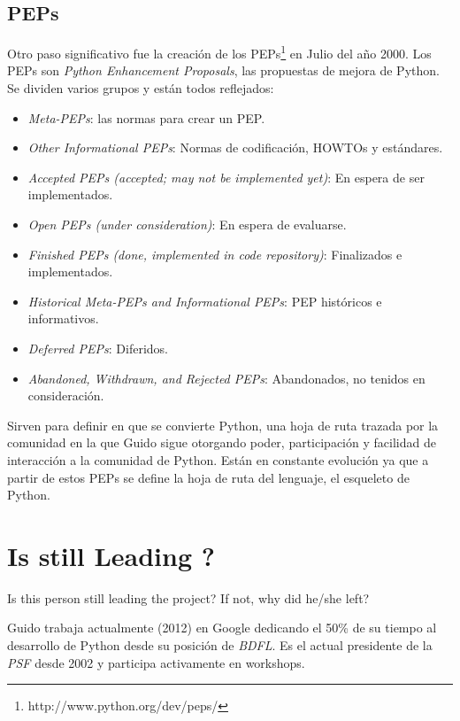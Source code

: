 \documentclass[11pt]{scrartcl}
\begin{document}
\subsection{PEPs}

Otro paso significativo fue la creación de los PEPs\footnote{http://www.python.org/dev/peps/} en Julio del año 2000. Los PEPs son \emph{Python Enhancement Proposals}, las propuestas de mejora de Python. Se dividen varios grupos y están todos reflejados:

\begin{itemize}
    \item \emph{Meta-PEPs}: las normas para crear un PEP.
    \item \emph{Other Informational PEPs}: Normas de codificación, HOWTOs y estándares.
    \item \emph{Accepted PEPs (accepted; may not be implemented yet)}: En espera de ser implementados.
    \item \emph{Open PEPs (under consideration)}: En espera de evaluarse.
    \item \emph{Finished PEPs (done, implemented in code repository)}: Finalizados e implementados.
    \item \emph{Historical Meta-PEPs and Informational PEPs}: PEP históricos e informativos.
    \item \emph{Deferred PEPs}: Diferidos.
    \item \emph{Abandoned, Withdrawn, and Rejected PEPs}: Abandonados, no tenidos en consideración.
\end{itemize}

Sirven para definir en que se convierte Python, una hoja de ruta trazada por la comunidad en la que Guido sigue otorgando poder, participación y facilidad de interacción a la comunidad de Python. Están en constante evolución ya que a partir de estos PEPs se define la hoja de ruta del lenguaje, el esqueleto de Python.

\section{Is still Leading ?}

Is this person still leading the project? If not, why did he/she left?

Guido trabaja actualmente (2012) en Google dedicando el 50\% de su tiempo al desarrollo de Python desde su posición de \emph{BDFL}. Es el actual presidente de la \emph{PSF} desde 2002 y participa activamente en workshops.
\end{document}
